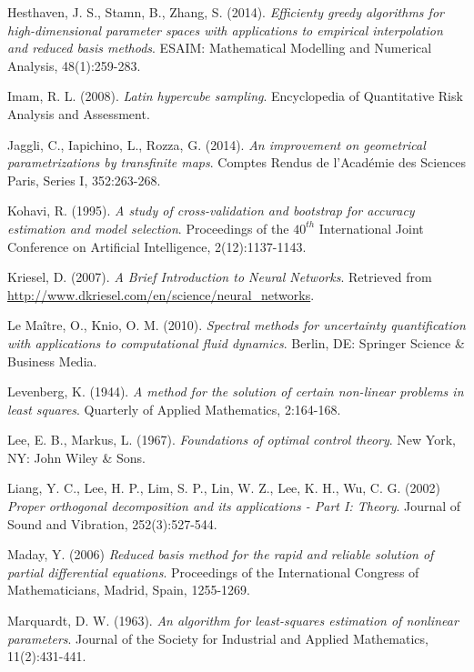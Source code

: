 \documentclass[longtitle]{elsarticle}
\numberwithin{equation}{section}
\theoremstyle{theorem}
\theoremstyle{definition}
\theoremstyle{remark}
\theoremstyle{proposition}
\numberwithin{figure}{section}
\begin{document}
\begin{thebibliography}{50}
		Hesthaven, J. S., Stamn, B., Zhang, S. (2014). \emph{Efficienty greedy algorithms for high-dimensional parameter spaces with applications to empirical interpolation and reduced basis methods}. ESAIM: Mathematical Modelling and Numerical Analysis, 48(1):259-283.
		
		Imam, R. L. (2008). \emph{Latin hypercube sampling}. Encyclopedia of Quantitative Risk Analysis and Assessment.
		
		Jaggli, C., Iapichino, L., Rozza, G. (2014). \emph{An improvement on geometrical parametrizations by transfinite maps}. Comptes Rendus de l'Acad\'emie des Sciences Paris, Series I, 352:263-268. 
				
		Kohavi, R. (1995). \emph{A study of cross-validation and bootstrap for accuracy estimation and model selection}. Proceedings of the $40^{th}$ International Joint Conference on Artificial Intelligence, 2(12):1137-1143.
		
		Kriesel, D. (2007). \emph{A Brief Introduction to Neural Networks}. Retrieved from \url{http://www.dkriesel.com/en/science/neural_networks}.
		
		Le Ma\^{i}tre, O., Knio, O. M. (2010). \emph{Spectral methods for uncertainty quantification with applications to computational fluid dynamics}. Berlin, DE: Springer Science \& Business Media.
		
		\textcolor{deepgreen}{
			Levenberg, K. (1944). \emph{A method for the solution of certain non-linear problems in least squares}. Quarterly of Applied Mathematics, 2:164-168.
		}

		Lee, E. B., Markus, L. (1967). \emph{Foundations of optimal control theory}. New York, NY: John Wiley \& Sons.
		
		Liang, Y. C., Lee, H. P., Lim, S. P., Lin, W. Z., Lee, K. H., Wu, C. G. (2002) \emph{Proper orthogonal decomposition and its applications - Part I: Theory}. Journal of Sound and Vibration, 252(3):527-544.

		Maday, Y. (2006) \emph{Reduced basis method for the rapid and reliable solution of partial differential equations}. Proceedings of the International Congress of Mathematicians, Madrid, Spain, 1255-1269.
		
		Marquardt, D. W. (1963). \emph{An algorithm for least-squares estimation of nonlinear parameters}. Journal of the Society for Industrial and Applied Mathematics, 11(2):431-441.
		

\end{thebibliography}
\end{document}
